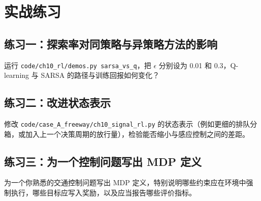 \section{实战练习}

\subsection*{练习一：探索率对同策略与异策略方法的影响}

运行 \texttt{code/ch10\_rl/demos.py sarsa\_vs\_q}，把 $\epsilon$ 分别设为 0.01 和 0.3，Q-learning 与 SARSA 的路径与训练回报如何变化？

\subsection*{练习二：改进状态表示}

修改 \texttt{code/case\_A\_freeway/ch10\_signal\_rl.py} 的状态表示（例如更细的排队分箱，或加入上一个决策周期的放行量），检验能否缩小与感应控制之间的差距。

\subsection*{练习三：为一个控制问题写出 MDP 定义}

为一个你熟悉的交通控制问题写出 MDP 定义，特别说明哪些约束应在环境中强制执行，哪些目标应写入奖励，以及应当报告哪些评价指标。

